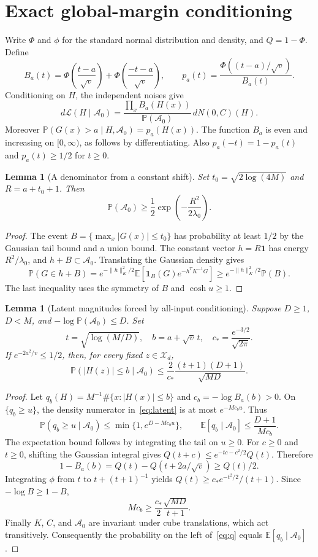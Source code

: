 \documentclass[11pt]{article}
\newtheorem{lemma}[theorem]{Lemma}
\newcommand{\E}{\mathbb E}
\newcommand{\Pp}{\mathbb P}
\newcommand{\ind}{\mathbf 1}
\begin{document}
\section{Exact global-margin conditioning}
Write $\Phi$ and $\phi$ for the standard normal distribution and density, and $Q=1-\Phi$. Define
\[
 B_a(t)=\Phi\!\left(\frac{t-a}{\sqrt v}\right)
       +\Phi\!\left(\frac{-t-a}{\sqrt v}\right),
 \qquad
 p_a(t)=\frac{\Phi((t-a)/\sqrt v)}{B_a(t)}.
\]
Conditioning on $H$, the independent noises give
\begin{equation}\label{eq:latent}
 d\mathcal L(H\mid\mathcal A_0)
 =\frac{\prod_x B_a(H(x))}{\Pp(\mathcal A_0)}\,dN(0,C)(H).
\end{equation}
Moreover $\Pp(G(x)>a\mid H,\mathcal A_0)=p_a(H(x))$.
The function $B_a$ is even and increasing on $[0,\infty)$, as follows by differentiating. Also $p_a(-t)=1-p_a(t)$ and $p_a(t)\ge1/2$ for $t\ge0$.

\begin{lemma}[A denominator from a constant shift]\label{lem:denom}
Set $t_0=\sqrt{2\log(4M)}$ and $R=a+t_0+1$. Then
\[
 \Pp(\mathcal A_0)\ge\frac12\exp\!\left(-\frac{R^2}{2\lambda_0}\right).
\]
\end{lemma}
\begin{proof}
The event $B=\{\max_x|G(x)|\le t_0\}$ has probability at least $1/2$ by the Gaussian tail bound and a union bound. The constant vector $h=R\ind$ has energy $R^2/\lambda_0$, and $h+B\subset\mathcal A_0$. Translating the Gaussian density gives
\[
 \Pp(G\in h+B)
 =e^{-\|h\|_K^2/2}\E[\ind_B(G)e^{-h^TK^{-1}G}]
 \ge e^{-\|h\|_K^2/2}\Pp(B).
\]
The last inequality uses the symmetry of $B$ and $\cosh u\ge1$.
\end{proof}

\begin{lemma}[Latent magnitudes forced by all-input conditioning]\label{lem:margin}
Suppose $D\ge1$, $D<M$, and $-\log\Pp(\mathcal A_0)\le D$. Set
\[
 t=\sqrt{\log(M/D)},\quad b=a+\sqrt v\,t,\quad
 c_* =\frac{e^{-3/2}}{\sqrt{2\pi}}.
\]
If $e^{-2a^2/v}\le1/2$, then, for every fixed $z\in\mathcal X_d$,
\begin{equation}\label{eq:q}
 \Pp(|H(z)|\le b\mid\mathcal A_0)
 \le \frac{2}{c_*}\frac{(t+1)(D+1)}{\sqrt{MD}}.
\end{equation}
\end{lemma}
\begin{proof}
Let $q_b(H)=M^{-1}\#\{x:|H(x)|\le b\}$ and $c_b=-\log B_a(b)>0$.
On $\{q_b\ge u\}$, the density numerator in~\eqref{eq:latent} is at most $e^{-M c_bu}$. Thus
\[
 \Pp(q_b\ge u\mid\mathcal A_0)\le\min\{1,e^{D-Mc_bu}\},
 \qquad \E[q_b\mid\mathcal A_0]\le\frac{D+1}{M c_b}.
\]
The expectation bound follows by integrating the tail on $u\ge0$.
For $c\ge0$ and $t\ge0$, shifting the Gaussian integral gives
$Q(t+c)\le e^{-tc-c^2/2}Q(t)$. Therefore
\[
 1-B_a(b)=Q(t)-Q(t+2a/\sqrt v)\ge Q(t)/2.
\]
Integrating $\phi$ from $t$ to $t+(t+1)^{-1}$ yields
$Q(t)\ge c_*e^{-t^2/2}/(t+1)$.
Since $-\log B\ge1-B$,
\[
 M c_b\ge\frac{c_*}{2}\frac{\sqrt{MD}}{t+1}.
\]
Finally $K$, $C$, and $\mathcal A_0$ are invariant under cube translations, which act transitively. Consequently the probability on the left of~\eqref{eq:q} equals $\E[q_b\mid\mathcal A_0]$.
\end{proof}
\end{document}
